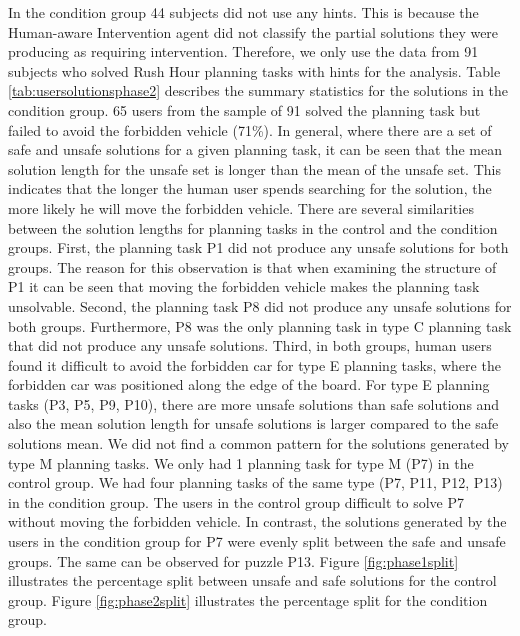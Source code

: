 In the condition group 44 subjects did not use any hints.
This is because the Human-aware Intervention agent did not classify the partial solutions they were producing as requiring intervention.
Therefore, we only use the data from 91 subjects who solved Rush Hour planning tasks with hints for the analysis. 
Table \ref{tab:usersolutionsphase2} describes the summary statistics for the solutions in the condition group.
65 users from the sample of 91 solved the planning task but failed to avoid the forbidden vehicle (71\%).
In general, where there are a set of safe and unsafe solutions for a given planning task, it can be seen that the mean solution length for the unsafe set is longer than the mean of the unsafe set.
This indicates that the longer the human user spends searching for the solution, the more likely he will move the forbidden vehicle.
There are several similarities between the solution lengths for planning tasks in the control and the condition groups.
First, the planning task P1 did not produce any unsafe solutions for both groups.
The reason for this observation is that when examining the structure of P1 it can be seen that moving the forbidden vehicle makes the planning task unsolvable.
Second, the planning task P8 did not produce any unsafe solutions for both groups.
Furthermore, P8 was the only planning task in type C planning task that did not produce any unsafe solutions.
Third, in both groups, human users found it difficult to avoid the forbidden car for type E planning tasks, where the forbidden car was positioned along the edge of the board.
For type E planning tasks (P3, P5, P9, P10), there are more unsafe solutions than safe solutions and also the mean solution length for unsafe solutions is larger compared to the safe solutions mean.
We did not find a common pattern for the solutions generated by type M planning tasks.
We only had 1 planning task for type M (P7) in the control group.
We had four planning tasks of the same type (P7, P11, P12, P13) in the condition group.
The users in the control group difficult to solve P7 without moving the forbidden vehicle.
In contrast, the solutions generated by the users in the condition group for P7 were evenly split between the safe and unsafe groups.
The same can be observed for puzzle P13.
Figure \ref{fig:phase1split} illustrates the percentage split between unsafe and safe solutions for the control group. 
Figure \ref{fig:phase2split} illustrates the percentage split for the condition group. 

